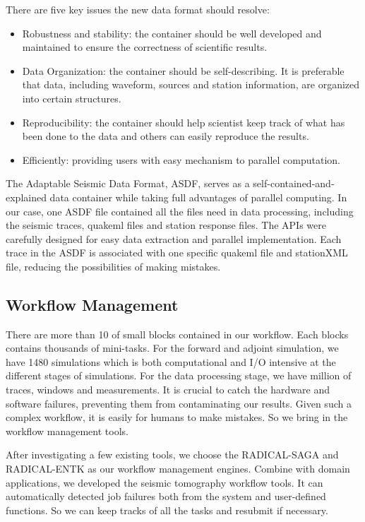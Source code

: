 \documentclass[extra,mreferee]{gji}
\begin{document}
There are five key issues the new data format should resolve:
\begin{itemize}
    \item Robustness and stability: the container should be well developed and maintained to ensure the correctness of scientific results.
    \item Data Organization: the container should be self-describing. It is preferable that data, including waveform, sources and station information, are organized into certain structures.
    \item Reproducibility: the container should help scientist keep track of what has been done to the data and others can easily reproduce the results.
    \item Efficiently: providing users with easy mechanism to parallel computation.

\end{itemize}

The Adaptable Seismic Data Format, ASDF, serves as a self-contained-and-explained data container while taking full advantages of parallel computing. In our case, one ASDF file contained all the files need in data processing, including the seismic traces, quakeml files and station response files. The APIs were carefully designed for easy data extraction and parallel implementation. Each trace in the ASDF is associated with one specific quakeml file and stationXML file, reducing the possibilities of making mistakes.

\citep{krischer2016adaptable}

\subsection{Workflow Management}

There are more than 10 of small blocks contained in our workflow. Each blocks contains thousands of mini-tasks. For the forward and adjoint simulation, we have 1480 simulations which is both computational and I/O intensive at the different stages of simulations. For the data processing stage, we have million of traces, windows and measurements. It is crucial to catch the hardware and software failures, preventing them from contaminating our results. Given such a complex workflow, it is easily for humans to make mistakes. So we bring in the workflow management tools.

After investigating a few existing tools, we choose the RADICAL-SAGA and RADICAL-ENTK as our workflow management engines. Combine with domain applications, we developed the seismic tomography workflow tools. It can automatically detected job failures both from the system and user-defined functions. So we can keep tracks of all the tasks and resubmit if necessary.
\end{document}
